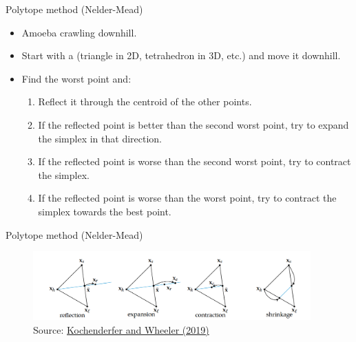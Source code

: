 \documentclass[11pt,xcolor={dvipsnames},aspectratio=159,hyperref={pdftex,pdfpagemode=UseNone,hidelinks,pdfdisplaydoctitle=true},usepdftitle=false]{beamer}
\begin{document}
        
    \begin{frame}
    \end{frame}

    \begin{frame}{Polytope method (Nelder-Mead)}
        \begin{itemize}
        \item Amoeba crawling downhill.
        \item Start with a  (triangle in 2D, tetrahedron in 3D, etc.) and move it downhill.
        \item Find the worst point and:
        \begin{enumerate}
            \item Reflect it through the centroid of the other points.
            \item If the reflected point is better than the second worst point, try to expand the simplex in that direction.
            \item If the reflected point is worse than the second worst point, try to contract the simplex.
            \item If the reflected point is worse than the worst point, try to contract the simplex towards the best point.
        \end{enumerate}
        \end{itemize}
    \end{frame}

    \begin{frame}{Polytope method (Nelder-Mead)}
        \centering
        \begin{figure}

        \includegraphics[width=0.95\textwidth]{nelder_mead.png}
        \caption{Source: \href{https://mitpress.mit.edu/9780262039420/}{Kochenderfer and Wheeler (2019)}}
        \end{figure}
    \end{frame}
\end{document}

